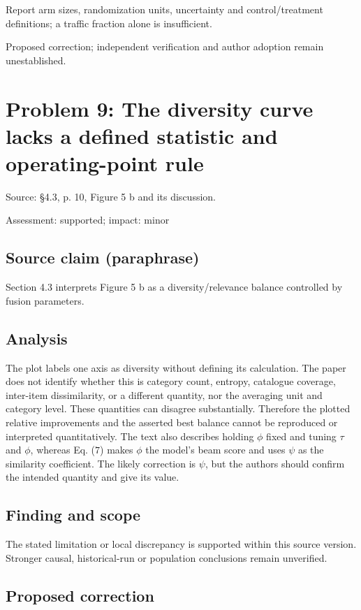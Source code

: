 \documentclass[11pt]{article}
\begin{document}
Report arm sizes, randomization units, uncertainty and control/treatment definitions; a traffic fraction alone is insufficient.

Proposed correction; independent verification and author adoption remain unestablished.

\section*{Problem 9: The diversity curve lacks a defined statistic and operating-point rule}

Source: §4.3, p. 10, Figure 5 b and its discussion.

Assessment: supported; impact: minor

\subsection*{Source claim (paraphrase)}

Section 4.3 interprets Figure 5 b as a diversity/relevance balance controlled by fusion parameters.

\subsection*{Analysis}

The plot labels one axis as diversity without defining its calculation. The paper does not identify whether this is category count, entropy, catalogue coverage, inter-item dissimilarity, or a different quantity, nor the averaging unit and category level. These quantities can disagree substantially. Therefore the plotted relative improvements and the asserted best balance cannot be reproduced or interpreted quantitatively. The text also describes holding \(\phi\) fixed and tuning \(\tau\) and \(\phi\), whereas Eq. (\(7\)) makes \(\phi\) the model's beam score and uses \(\psi\) as the similarity coefficient. The likely correction is \(\psi\), but the authors should confirm the intended quantity and give its value.

\subsection*{Finding and scope}

The stated limitation or local discrepancy is supported within this source version. Stronger causal, historical-run or population conclusions remain unverified.

\subsection*{Proposed correction}
\end{document}
